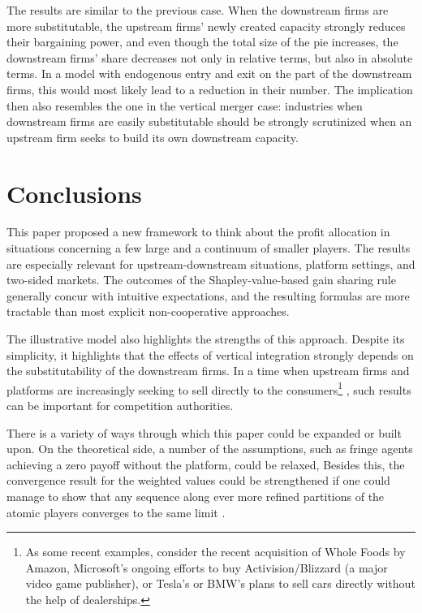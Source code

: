 \documentclass[a4paper]{article}
\begin{document}
The results are similar to the previous case.
When the downstream firms are more substitutable, the upstream firms' newly created capacity strongly reduces their bargaining power, and even though the total size of the pie increases, the downstream firms' share decreases not only in relative terms, but also in absolute terms.
In a model with endogenous entry and exit on the part of the downstream firms, this would most likely lead to a reduction in their number.
The implication then also resembles the one in the vertical merger case: industries when downstream firms are easily substitutable should be strongly scrutinized when an upstream firm seeks to build its own downstream capacity.


\section{Conclusions}

This paper proposed a new framework to think about the profit allocation in situations concerning a few large and a continuum of smaller players.
The results are especially relevant for upstream-downstream situations, platform settings, and two-sided markets.
The outcomes of the Shapley-value-based gain sharing rule generally concur with intuitive expectations, and the resulting formulas are more tractable than most explicit non-cooperative approaches.

The illustrative model also highlights the strengths of this approach.
Despite its simplicity, it highlights that the effects of vertical integration strongly depends on the substitutability of the downstream firms.
In a time when upstream firms and platforms are increasingly seeking to sell directly to the consumers\footnote{
    As some recent examples, consider the recent acquisition of Whole Foods by Amazon, Microsoft's ongoing efforts to buy Activision/Blizzard (a major video game publisher), or Tesla's or BMW's plans to sell cars directly without the help of dealerships.
}
, such results can be important for competition authorities.

There is a variety of ways through which this paper could be expanded or built upon.
On the theoretical side, a number of the assumptions, such as fringe agents achieving a zero payoff without the platform, could be relaxed,
Besides this, the convergence result for the weighted values could be strengthened if one could manage to show that any sequence along ever more refined partitions of the atomic players converges to the same limit \parencite[à la][]{fogelman1980asymptotic}.
\end{document}
